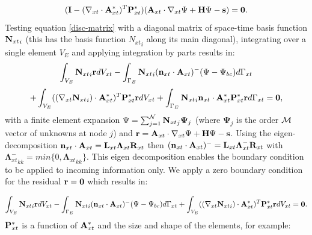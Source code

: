\begin{equation}
 ({\bf I}- ({\nabla_{xt}} \cdot{{\bf A}_{xt}^*})^T {\bf P}_{xt}^* )({\bf A}_{xt} \cdot {\nabla_{xt}} \Psi +{\bf H}  \Psi -{\bf s})={\bf 0}.
\label{disc-matrix}
\end{equation}
 Testing equation \ref{disc-matrix} with a diagonal matrix of
 space-time basis function ${{\bf N}_{xt}}_i$ (this has the basis
 function ${N_{xt}}_i$ along
its main diagonal),
 integrating over a single element $V_E$ and applying integration
 by parts results in:
\begin{equation}
 \int_{V_E}
 {{\bf N}_{xt}}_i {\bf r} d V_{xt} - \int_{\Gamma_E} {{\bf N}_{xt}}_i
 ({\bf n}_{xt}\cdot{{\bf A}_{xt}} )^- (\Psi-\Psi_{bc}) d \Gamma_{xt}
\label{disc2-matrix-1}
\end{equation}
\begin{equation}
 +
 \int_{V_E} (({\nabla_{xt}} {{\bf N}_{xt}}_i ) \cdot{{\bf A}_{xt}^*})^T {\bf P}_{xt}^*  {\bf r} d V_{xt}
 +\int_{\Gamma_E} {{\bf N}_{xt}}_i {\bf n}_{xt}\cdot{{\bf A}_{xt}^*}  {\bf P}_{xt}^* {\bf r}  d \Gamma_{xt}
 ={\bf 0},
\label{disc2-matrix-2}
\end{equation}
 with a finite element expansion $\Psi=\sum_{j=1}^{\cal N} {{\bf N}_{xt}}_j
 {\mathbf \Psi}_j$ (where ${\mathbf \Psi}_j$ is the order $\cal M$ vector of
 unknowns at node $j$)
 and ${\bf r}={\bf A}_{xt} \cdot {\nabla_{xt}} \Psi +{\bf H} \Psi -{\bf s}$.
 Using the eigen-decomposition
 ${\bf n}_{xt}\cdot{{\bf A}_{xt}}={\bf L}_{xt} {\mathbf \Lambda}_{xt} {\bf R}_{xt}$ then
 $({\bf n}_{xt}\cdot{{\bf A}_{xt}})^-={\bf L}_{xt} {\mathbf \Lambda}_{xt}^- {\bf R}_{xt}$
 with ${{\mathbf \Lambda}_{xt}^-}_{kk} = min\{ 0, {{\mathbf \Lambda}_{xt}}_{kk} \}$. This eigen
 decomposition enables the boundary condition to be applied to incoming
 information only.
   We apply a zero boundary
 condition for the residual ${\bf r}={\bf 0}$ which results in:

\begin{equation}
 \int_{V_E}
 {{\bf N}_{xt}}_i {\bf r} d V_{xt}
 - \int_{\Gamma_E} {{\bf N}_{xt}}_i ({\bf n}_{xt}\cdot{{\bf A}_{xt}})^- (\Psi-\Psi_{bc})
 d \Gamma_{xt}
 +
  \int_{V_E} (({\nabla_{xt}} {{\bf N}_{xt}}_i ) \cdot{{\bf A}_{xt}^*})^T {\bf P}_{xt}^*  {\bf r} d V_{xt}
 ={\bf 0}.
\label{disc3-matrix}
\end{equation}
 ${\bf P}^*_{xt}$ is a function of ${\bf A}^*_{xt}$ and the size and shape of the
 elements, for example:

